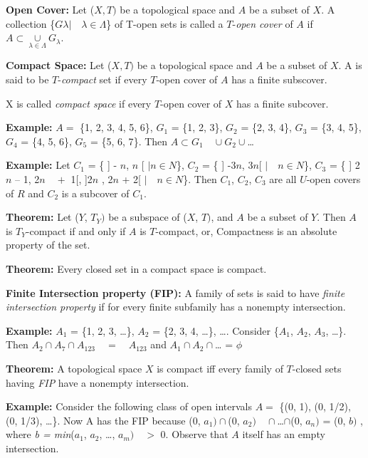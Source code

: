 \documentclass[12pt]{amsart}
\begin{document}
\textbf{Open Cover:} Let ($X, T)$ be a topological space and $A$ be a subset of $X$. A 
collection {\{}$G\lambda \vert  \quad \lambda \in \Lambda ${\}} of T-open sets 
is called a $T$-\textit{open cover} of $A$ if $A\subset \mathop \cup \limits_{\lambda \in \Lambda } 
G_\lambda $.

\textbf{Compact Space:} Let ($X, T)$ be a topological space and $A$ be a subset of 
$X$. A is said to be $T$-\textit{compact} set if every $T$-open cover of $A$ has a finite subscover.

X is called \textit{compact space }if every $T$-open cover of $X$ has a finite subcover.

\textbf{Example:} $A =$ {\{}1, 2, 3, 4, 5, 6{\}}, $G_{1}$ = {\{}1, 2, 3{\}}, 
$G_{2}$ = {\{}2, 3, 4{\}}, $G_{3}$ = {\{}3, 4, 5{\}}, $G_{4}$ = {\{}4, 5, 
6{\}}, $G_{5}$ = {\{}5, 6, 7{\}}. Then $A\subset G_{1} \quad \cup G_{2}\cup 
${\ldots}

\textbf{Example:} Let $C_{1}$ = {\{} ] - $n$, $n$ [ $\vert n\in N${\}}, $C_{2}$ = 
{\{} ] -3$n$, 3$n$[ $\vert  \quad n\in N${\}}, $C_{3}$ = {\{} ] 2$n$ -- 1, 2$n \quad +$ 1[, ]2$n$ , 2$n$ + 
2[ $\vert  \quad n\in N${\}}. Then $C_{1}$, $C_{2}$, $C_{3}$ are all $U$-open covers of 
$R$ and $C_{2}$ is a subcover of $C_{1}$.

\textbf{Theorem:} Let ($Y$, $T_{Y})$ be a subspace of ($X$, $T)$, and $A$ be a subset of 
$Y$. Then $A$ is $T_{Y}$-compact if and only if $A$ is $T$-compact, or, Compactness is an 
absolute property of the set.

\textbf{Theorem:} Every closed set in a compact space is compact.

\textbf{Finite Intersection property (FIP):} A family of sets is said to 
have \textit{finite intersection property} if for every finite subfamily has a nonempty intersection.

\textbf{Example:} $A_{1}$ = {\{}1, 2, 3, {\ldots}{\}}, $A_{2}$ = {\{}2, 3, 4, 
{\ldots}{\}}, {\ldots}. Consider {\{}$A_{1}$, $A_{2}$, $A_{3}$, {\ldots}{\}}. 
Then $A_{2}\cap A_{7}\cap A_{123} \quad = \quad A_{123}$ and $A_{1}\cap 
A_{2}\cap ${\ldots} = $\phi $

\textbf{Theorem:} A topological space $X$ is compact iff every family of 
$T$-closed sets having \textit{FIP} have a nonempty intersection.

\textbf{Example:} Consider the following class of open intervals $A =$ {\{}(0, 
1), (0, 1/2), (0, 1/3), {\ldots}{\}}. Now A has the FIP because (0, 
$a_{1})\cap $(0, $a_{2}) \quad \cap ${\ldots}$\cap $(0, $a_{n})$ = (0, $b)$ , where 
\textit{b = min}($a_{1}$, $a_{2}$, {\ldots}, $a_{m}) \quad >$ 0. Observe that $A$ itself has an empty 
intersection.
\end{document}
